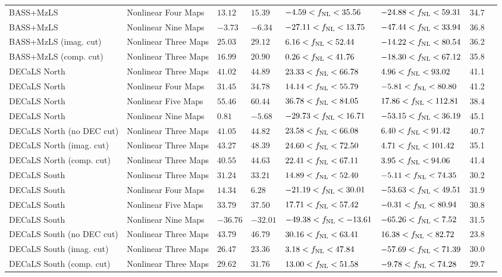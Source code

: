 \begin{table}
{\begin{tabular}{llllllll}
BASS+MzLS                 & Nonlinear Four Maps& $ 13.12$& $ 15.39$& $ -4.59<f_{\rm NL}< 35.56$& $-24.88<f_{\rm NL}< 59.31$ &   34.7\\
BASS+MzLS                 & Nonlinear Nine Maps& $ -3.73$& $ -6.34$& $-27.11<f_{\rm NL}< 13.75$& $-47.44<f_{\rm NL}< 33.94$ &   36.8\\
BASS+MzLS (imag. cut)     & Nonlinear Three Maps& $ 25.03$& $ 29.12$& $  6.16<f_{\rm NL}< 52.44$& $-14.22<f_{\rm NL}< 80.54$ &   36.2\\
BASS+MzLS (comp. cut)     & Nonlinear Three Maps& $ 16.99$& $ 20.90$& $  0.26<f_{\rm NL}< 41.76$& $-18.30<f_{\rm NL}< 67.12$ &   35.8\\
DECaLS North              & Nonlinear Three Maps& $ 41.02$& $ 44.89$& $ 23.33<f_{\rm NL}< 66.78$& $  4.96<f_{\rm NL}< 93.02$ &   41.1\\
DECaLS North              & Nonlinear Four Maps& $ 31.45$& $ 34.78$& $ 14.14<f_{\rm NL}< 55.79$& $ -5.81<f_{\rm NL}< 80.80$ &   41.2\\
DECaLS North              & Nonlinear Five Maps& $ 55.46$& $ 60.44$& $ 36.78<f_{\rm NL}< 84.05$& $ 17.86<f_{\rm NL}<112.81$ &   38.4\\
DECaLS North              & Nonlinear Nine Maps& $  0.81$& $ -5.68$& $-29.73<f_{\rm NL}< 16.71$& $-53.15<f_{\rm NL}< 36.19$ &   45.1\\
DECaLS North (no DEC cut) & Nonlinear Three Maps& $ 41.05$& $ 44.82$& $ 23.58<f_{\rm NL}< 66.08$& $  6.40<f_{\rm NL}< 91.42$ &   40.7\\
DECaLS North (imag. cut)  & Nonlinear Three Maps& $ 43.27$& $ 48.39$& $ 24.60<f_{\rm NL}< 72.50$& $  4.71<f_{\rm NL}<101.42$ &   35.1\\
DECaLS North (comp. cut)  & Nonlinear Three Maps& $ 40.55$& $ 44.63$& $ 22.41<f_{\rm NL}< 67.11$& $  3.95<f_{\rm NL}< 94.06$ &   41.4\\
DECaLS South              & Nonlinear Three Maps& $ 31.24$& $ 33.21$& $ 14.89<f_{\rm NL}< 52.40$& $ -5.11<f_{\rm NL}< 74.35$ &   30.2\\
DECaLS South              & Nonlinear Four Maps& $ 14.34$& $  6.28$& $-21.19<f_{\rm NL}< 30.01$& $-53.63<f_{\rm NL}< 49.51$ &   31.9\\
DECaLS South              & Nonlinear Five Maps& $ 33.79$& $ 37.50$& $ 17.71<f_{\rm NL}< 57.42$& $ -0.31<f_{\rm NL}< 80.94$ &   30.8\\
DECaLS South              & Nonlinear Nine Maps& $-36.76$& $-32.01$& $-49.38<f_{\rm NL}<-13.61$& $-65.26<f_{\rm NL}<  7.52$ &   31.5\\
DECaLS South (no DEC cut) & Nonlinear Three Maps& $ 43.79$& $ 46.79$& $ 30.16<f_{\rm NL}< 63.41$& $ 16.38<f_{\rm NL}< 82.72$ &   23.8\\
DECaLS South (imag. cut)  & Nonlinear Three Maps& $ 26.47$& $ 23.36$& $  3.18<f_{\rm NL}< 47.84$& $-57.69<f_{\rm NL}< 71.39$ &   30.0\\
DECaLS South (comp. cut)  & Nonlinear Three Maps& $ 29.62$& $ 31.76$& $ 13.00<f_{\rm NL}< 51.58$& $ -9.78<f_{\rm NL}< 74.28$ &   29.7\\
   \hline
    \end{tabular}}
\end{table}

